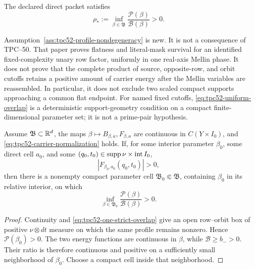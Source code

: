 \begin{assumption}
\label{ass:tpc52-profile-nondegeneracy}
The declared direct packet satisfies
\begin{equation}
 \boxed{
 \rho_*:=\inf_{\beta\in\mathfrak B}
          \frac{\mathscr P(\beta)}{\mathscr B(\beta)}>0.}
 \label{eq:tpc52-uniform-overlap}
\end{equation}
\end{assumption}

Assumption~\ref{ass:tpc52-profile-nondegeneracy} is new.  It is not a
consequence of TPC--50.  That paper proves flatness and literal-mask survival
for an identified fixed-complexity unary row factor, uniformly in one
real-axis Mellin phase.  It does not prove that the complete product of
source, opposite-row, and orbit cutoffs retains a positive amount of carrier
energy after the Mellin variables are reassembled.  In particular, it does
not exclude two scaled compact supports approaching a common flat endpoint.
For named fixed cutoffs, \eqref{eq:tpc52-uniform-overlap} is a deterministic
support-geometry condition on a compact finite-dimensional parameter set; it
is not a prime-pair hypothesis.

\begin{lemma}
\label{lem:tpc52-local-active-subcell}
Assume \(\mathfrak B\subset\mathbb R^d\), the maps
\(\beta\mapsto B_{\beta,a},F_{\beta,a}\) are continuous in
\(C(Y\times I_0)\), and \eqref{eq:tpc52-carrier-normalization} holds.
If, for some interior parameter \(\beta_0\), some direct cell \(a_0\),
and some \((q_0,t_0)\in\operatorname{supp}\nu\times\operatorname{int}I_0\),
\begin{equation}
 |F_{\beta_0,a_0}(q_0,t_0)|>0,
 \label{eq:tpc52-one-strict-overlap}
\end{equation}
then there is a nonempty compact parameter cell
\(\mathfrak B_0\Subset\mathfrak B\), containing \(\beta_0\) in its
relative interior, on which
\begin{equation}
 \inf_{\beta\in\mathfrak B_0}
 \frac{\mathscr P(\beta)}{\mathscr B(\beta)}>0.
 \label{eq:tpc52-local-active-ratio}
\end{equation}
\end{lemma}

\begin{proof}
Continuity and \eqref{eq:tpc52-one-strict-overlap} give an open
row--orbit box of positive \(\nu\otimes dt\) measure on which the same
profile remains nonzero.  Hence \(\mathscr P(\beta_0)>0\).  The two
energy functions are continuous in \(\beta\), while
\(\mathscr B\ge b_->0\).  Their ratio is therefore continuous and
positive on a sufficiently small neighborhood of \(\beta_0\).  Choose
a compact cell inside that neighborhood.
\end{proof}


